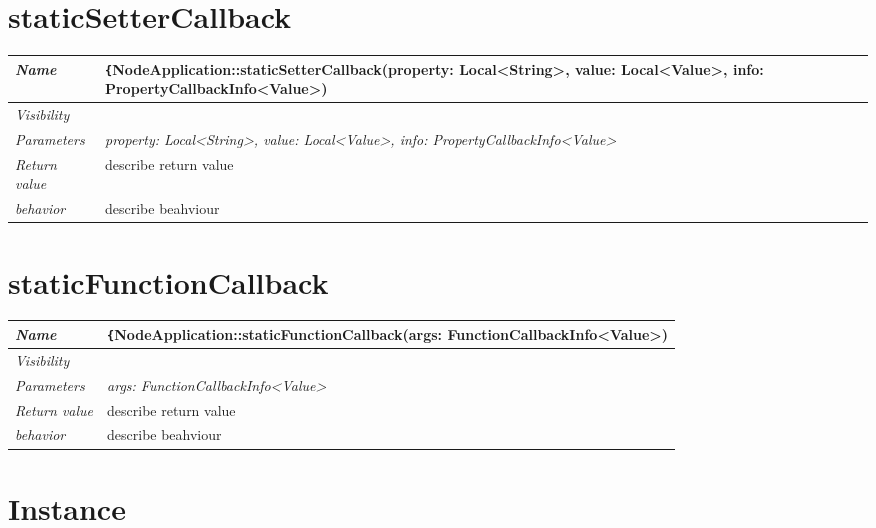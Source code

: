  \pagebreak\n\section{staticSetterCallback}
\begin{longtable}{p{3cm} @{\hskip 1cm} p{12cm}}
 \hline
\textit{Name} & \texttt\{NodeApplication::staticSetterCallback(property: Local<String>, value: Local<Value>, info: PropertyCallbackInfo<Value>)}\\
\hline
 \textit{Visibility} & \\
\hline
\textit{Parameters} & \textit{property: Local<String>, value: Local<Value>, info: PropertyCallbackInfo<Value>}\\
\hline
\textit{Return value} & \textbf{} describe return value\\
  \hline
  \textit{behavior} & describe beahviour \\
  \hline
\end{longtable}
 \pagebreak\n\section{staticFunctionCallback}
\begin{longtable}{p{3cm} @{\hskip 1cm} p{12cm}}
 \hline
\textit{Name} & \texttt\{NodeApplication::staticFunctionCallback(args: FunctionCallbackInfo<Value>)}\\
\hline
 \textit{Visibility} & \\
\hline
\textit{Parameters} & \textit{args: FunctionCallbackInfo<Value>}\\
\hline
\textit{Return value} & \textbf{} describe return value\\
  \hline
  \textit{behavior} & describe beahviour \\
  \hline
\end{longtable}
 \pagebreak\n\section{Instance}
